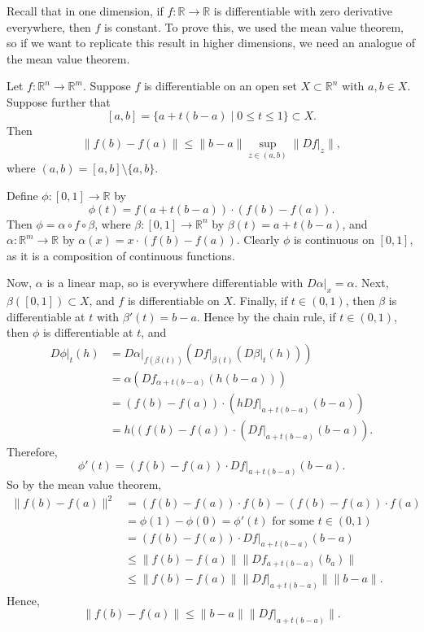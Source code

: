 \documentclass[12pt]{article}
\begin{document}
Recall that in one dimension, if $f : \mathbb{R} \to \mathbb{R}$ is differentiable with zero derivative everywhere, then $f$ is constant. To prove this, we used the mean value theorem, so if we want to replicate this result in higher dimensions, we need an analogue of the mean value theorem.

\begin{theorem}
	Let $f : \mathbb{R}^{n} \to \mathbb{R}^{m}$. Suppose $f$ is differentiable on an open set $X \subset \mathbb{R}^{n}$ with $a, b \in X$. Suppose further that
	\[
		[a, b] = \{a + t(b - a) \mid 0 \leq t \leq 1\} \subset X
	.\]
	Then
	\[
	\|f(b) - f(a)\| \leq \|b - a\| \sup_{z \in (a, b)}\|Df|_z\|
	,\]
	where $(a, b) = [a, b] \setminus \{a, b\}$.
\end{theorem}

\begin{proofbox}
	Define $\phi : [0, 1] \to \mathbb{R}$ by
	\[
	\phi(t) = f(a+t(b-a)) \cdot (f(b) - f(a))
	.\]
	Then $\phi = \alpha \circ f \circ \beta$, where $\beta : [0, 1] \to \mathbb{R}^{n}$ by $\beta(t) = a + t(b - a)$, and $\alpha : \mathbb{R}^{m} \to \mathbb{R}$ by $\alpha(x) = x \cdot (f(b) - f(a))$. Clearly $\phi$ is continuous on $[0, 1]$, as it is a composition of continuous functions.

	Now, $\alpha$ is a linear map, so is everywhere differentiable with $D\alpha|_{x} = \alpha$. Next, $\beta([0, 1]) \subset X$, and $f$ is differentiable on $X$. Finally, if $t \in (0, 1)$, then $\beta$ is differentiable at $t$ with $\beta'(t) = b - a$. Hence by the chain rule, if $t \in (0, 1)$, then $\phi$ is differentiable at $t$, and
	\begin{align*}
		D\phi|_t(h) &= D\alpha|_{f(\beta(t))} (Df|_{\beta (t)} (D \beta|_t(h))) \\
			    &= \alpha(Df_{\alpha + t(b - a)}(h(b - a))) \\
			    &= (f(b) - f(a)) \cdot (hDf|_{a + t(b - a)}(b-a)) \\
			    &= h((f(b) - f(a)) \cdot (Df|_{a + t(b-a)}(b - a)).
	\end{align*}
	Therefore,
	\[
	\phi'(t) = (f(b) - f(a)) \cdot Df|_{a + t(b-a)}(b-a)
	.\]
	So by the mean value theorem,
	\begin{align*}
		\|f(b) - f(a)\|^2 &= (f(b) - f(a)) \cdot f(b) - (f(b) - f(a)) \cdot f(a) \\
				  &= \phi(1) - \phi(0) = \phi'(t) \text{ for some } t \in (0, 1) \\
				  &= (f(b) - f(a)) \cdot Df|_{a + t(b-a)}(b - a) \\
				  &\leq \|f(b) - f(a) \| \| Df_{a+t(b-a)}(b_a)\| \\
				  &\leq \|f(b) - f(a)\| \|Df|_{a + t(b-a)}\| \|b - a\|.
	\end{align*}
	Hence,
	\[
	\|f(b) - f(a)\| \leq \|b - a\| \|Df|_{a+t(b-a)}\|
	.\]
\end{proofbox}
\end{document}
